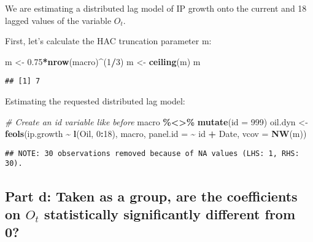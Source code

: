 \documentclass[
]{article}
\newenvironment{Shaded}{\begin{snugshade}}{\end{snugshade}}
\newcommand{\AttributeTok}[1]{\textcolor[rgb]{0.13,0.29,0.53}{#1}}
\newcommand{\CommentTok}[1]{\textcolor[rgb]{0.56,0.35,0.01}{\textit{#1}}}
\newcommand{\DecValTok}[1]{\textcolor[rgb]{0.00,0.00,0.81}{#1}}
\newcommand{\FloatTok}[1]{\textcolor[rgb]{0.00,0.00,0.81}{#1}}
\newcommand{\FunctionTok}[1]{\textcolor[rgb]{0.13,0.29,0.53}{\textbf{#1}}}
\newcommand{\NormalTok}[1]{#1}
\newcommand{\OtherTok}[1]{\textcolor[rgb]{0.56,0.35,0.01}{#1}}
\newcommand{\SpecialCharTok}[1]{\textcolor[rgb]{0.81,0.36,0.00}{\textbf{#1}}}
\begin{document}
We are estimating a distributed lag model of IP growth onto the current
and 18 lagged values of the variable \(O_t\).

First, let's calculate the HAC truncation parameter m:

\begin{Shaded}
\begin{Highlighting}[]
\NormalTok{m }\OtherTok{\textless{}{-}}  \FloatTok{0.75}\SpecialCharTok{*}\FunctionTok{nrow}\NormalTok{(macro)}\SpecialCharTok{\^{}}\NormalTok{(}\DecValTok{1}\SpecialCharTok{/}\DecValTok{3}\NormalTok{)}
\NormalTok{m }\OtherTok{\textless{}{-}} \FunctionTok{ceiling}\NormalTok{(m)}
\NormalTok{m}
\end{Highlighting}
\end{Shaded}

\begin{verbatim}
## [1] 7
\end{verbatim}

Estimating the requested distributed lag model:

\begin{Shaded}
\begin{Highlighting}[]
\CommentTok{\# Create an id variable like before}
\NormalTok{macro }\SpecialCharTok{\%\textless{}\textgreater{}\%} \FunctionTok{mutate}\NormalTok{(}\AttributeTok{id =} \DecValTok{999}\NormalTok{)}
\NormalTok{oil.dyn }\OtherTok{\textless{}{-}} \FunctionTok{feols}\NormalTok{(ip.growth }\SpecialCharTok{\textasciitilde{}} \FunctionTok{l}\NormalTok{(Oil, }\DecValTok{0}\SpecialCharTok{:}\DecValTok{18}\NormalTok{), macro,}
                   \AttributeTok{panel.id =} \SpecialCharTok{\textasciitilde{}}\NormalTok{ id }\SpecialCharTok{+}\NormalTok{ Date,}
                   \AttributeTok{vcov =} \FunctionTok{NW}\NormalTok{(m))}
\end{Highlighting}
\end{Shaded}

\begin{verbatim}
## NOTE: 30 observations removed because of NA values (LHS: 1, RHS: 30).
\end{verbatim}

\hypertarget{part-d-taken-as-a-group-are-the-coefficients-on-o_t-statistically-significantly-different-from-0}{%
\subsection{\texorpdfstring{Part d: Taken as a group, are the
coefficients on \(O_t\) statistically significantly different from
0?}{Part d: Taken as a group, are the coefficients on O\_t statistically significantly different from 0?}}\label{part-d-taken-as-a-group-are-the-coefficients-on-o_t-statistically-significantly-different-from-0}}
\end{document}
